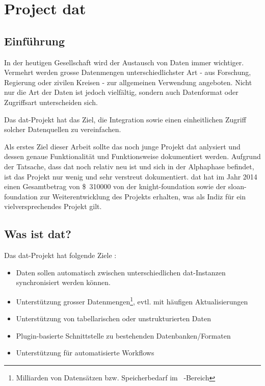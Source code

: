 \chapter{Project dat}\label{sec:dat}

\section{Einführung}

In der heutigen Gesellschaft wird der Austausch von Daten immer wichtiger. Vermehrt werden grosse Datenmengen unterschiedlichster Art - aus Forschung, Regierung oder zivilen Kreisen - zur allgemeinen Verwendung angeboten. Nicht nur die Art der Daten ist jedoch vielfältig, sondern auch Datenformat oder Zugriffsart unterscheiden sich.

Das \gls{dat}-Projekt hat das Ziel, die Integration sowie einen einheitlichen Zugriff solcher Datenquellen zu vereinfachen.

Als erstes Ziel dieser Arbeit sollte das noch junge Projekt \gls{dat} anlysiert und dessen genaue Funktionalität und Funktionsweise dokumentiert werden. Aufgrund der Tatsache, dass \gls{dat} noch relativ neu ist und sich in der Alphaphase befindet, ist das Projekt nur wenig und sehr verstreut dokumentiert. \Gls{dat} hat im Jahr 2014 einen Gesamtbetrag von \SI{310000}[{\$}]{} von der \gls{knight-foundation} sowie der \gls{sloan-foundation} zur Weiterentwicklung des Projekts erhalten, was als Indiz für ein vielversprechendes Projekt gilt.

\section{Was ist dat?} %

Das \gls{dat}-Projekt hat folgende Ziele \cite{what-is-dat}: 

\begin{itemize}
\item Daten sollen automatisch zwischen unterschiedlichen \gls{dat}-Instanzen synchronisiert werden können. 
\item Unterstützung grosser Datenmengen\footnote{Milliarden von Datensätzen bzw. Speicherbedarf im \si{\tera\byte}-Bereich}, evtl. mit häufigen Aktualisierungen
\item Unterstützung von tabellarischen oder unstrukturierten Daten
\item Plugin-basierte Schnittstelle zu bestehenden Datenbanken/Formaten
\item Unterstützung für automatisierte Workflows
\end{itemize}

